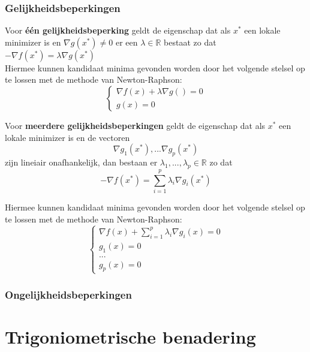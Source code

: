 \documentclass{article}
\begin{document}
	\subsubsection{Gelijkheidsbeperkingen}	
	Voor \textbf{één gelijkheidsbeperking} geldt de eigenschap dat als $x^*$ een lokale minimizer is en $\nabla g(x^*) \neq 0$ er een $\lambda \in \mathbb{R}$ bestaat zo dat $-\nabla f(x^*) = \lambda \nabla g(x^*)$\\
	
	Hiermee kunnen kandidaat minima gevonden worden door het volgende stelsel op te lossen met de methode van Newton-Raphson:
	\begin{equation*}
		\left\{
			\begin{array}{rr}
				\nabla f(x) + \lambda \nabla g() = 0\\
				g(x) = 0
			\end{array}
		\right.
	\end{equation*}
		
	Voor \textbf{meerdere gelijkheidsbeperkingen} geldt de eigenschap dat als $x^*$ een lokale minimizer is en de vectoren
	$$
		{\nabla g_1(x^*), ... \nabla g_p(x^*)}
	$$
	zijn lineiair onafhankelijk, dan bestaan er $\lambda_1, ... , \lambda_p \in \mathbb{R}$ zo dat
	$$
		-\nabla f(x^*) = \sum_{i=1}^{p} \lambda_i \nabla g_i(x^*)
	$$
	
	Hiermee kunnen kandidaat minima gevonden worden door het volgende stelsel op te lossen met de methode van Newton-Raphson:
	$$	
		\left\{
			\begin{array}{rr}
				\nabla f(x) + \sum_{i=1}^{p} \lambda_i \nabla g_i(x) = 0\\
				g_1(x) = 0\\
				...\\
				g_p(x) = 0
			\end{array}
		\right.
	$$

	
	\subsubsection{Ongelijkheidsbeperkingen}
	
	
	\section{Trigoniometrische benadering}
	
\end{document}
